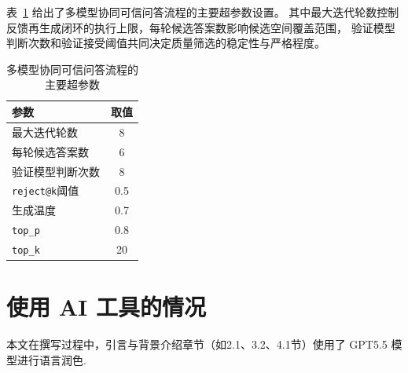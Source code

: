 表~\ref{tab:appendix-multi-model-config} 给出了多模型协同可信问答流程的主要超参数设置。
其中最大迭代轮数控制反馈再生成闭环的执行上限，每轮候选答案数影响候选空间覆盖范围，
验证模型判断次数和验证接受阈值共同决定质量筛选的稳定性与严格程度。

\begin{table}[htbp]
\caption{多模型协同可信问答流程的主要超参数}
\label{tab:appendix-multi-model-config}
\vspace{0.5em}\centering\wuhao
\begin{tabular}{lc}
\toprule
参数 & 取值 \\
\midrule
最大迭代轮数 & 8 \\
每轮候选答案数 & 6 \\
验证模型判断次数 & 8 \\
\texttt{reject@k}阈值 & 0.5 \\
生成温度 & 0.7 \\
\texttt{top\_p} & 0.8 \\
\texttt{top\_k} & 20 \\
\bottomrule
\end{tabular}
\end{table}

\section{使用 AI 工具的情况}
本文在撰写过程中，引言与背景介绍章节（如2.1、3.2、4.1节）使用了 GPT5.5 模型进行语言润色.



